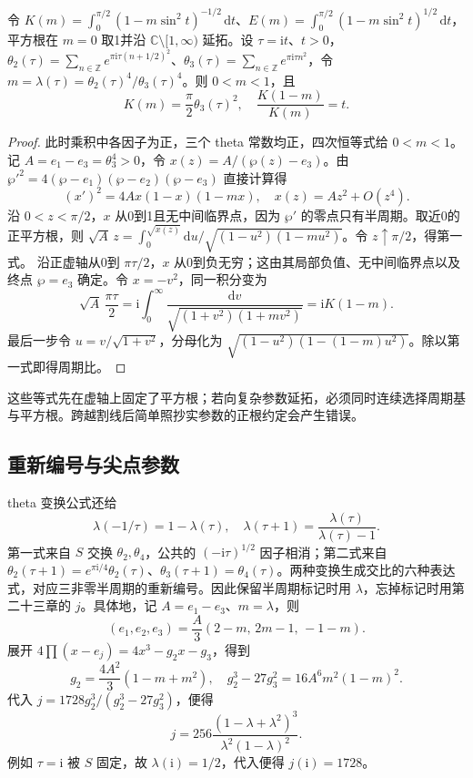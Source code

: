 \begin{proposition}\label{b3:prop:F-period-theta}
令 \(K(m)=\int_0^{\pi/2}(1-m\sin^2t)^{-1/2}\,\mathrm dt\)、\(E(m)=\int_0^{\pi/2}(1-m\sin^2t)^{1/2}\,\mathrm dt\)，平方根在 \(m=0\) 取1并沿 \(\mathbb C\setminus[1,\infty)\) 延拓。设 \(\tau=\mathrm it\)、\(t>0\)，\(\theta_2(\tau)=\sum_{n\in\mathbb Z}e^{\pi\mathrm i\tau(n+1/2)^2}\)、\(\theta_3(\tau)=\sum_{n\in\mathbb Z}e^{\pi\mathrm i\tau n^2}\)，令 \(m=\lambda(\tau)=\theta_2(\tau)^4/\theta_3(\tau)^4\)。则 \(0<m<1\)，且
\[
 K(m)=\frac\pi2\theta_3(\tau)^2,\quad
 \frac{K(1-m)}{K(m)}=t.
\]
\end{proposition}
\begin{proof}
此时乘积中各因子为正，三个 theta 常数均正，四次恒等式给 \(0<m<1\)。记 \(A=e_1-e_3=\theta_3^4>0\)，令
\(x(z)=A/(\wp(z)-e_3)\)。由 \(\wp'^2=4(\wp-e_1)(\wp-e_2)(\wp-e_3)\) 直接计算得
\[
 (x')^2=4A x(1-x)(1-mx),\quad x(z)=Az^2+O(z^4).
\]
沿 \(0<z<\pi/2\)，\(x\) 从0到1且无中间临界点，因为 \(\wp'\) 的零点只有半周期。取近0的正平方根，则
\(\sqrt A\,z=\int_0^{\sqrt{x(z)}}\mathrm{d}u/\sqrt{(1-u^2)(1-mu^2)}\)。令 \(z\uparrow\pi/2\)，得第一式。
沿正虚轴从0到 \(\pi\tau/2\)，\(x\) 从0到负无穷；这由其局部负值、无中间临界点以及终点 \(\wp=e_3\) 确定。令 \(x=-v^2\)，同一积分变为
\[
 \sqrt A\,\frac{\pi\tau}{2}
 =\mathrm{i}\int_0^\infty\frac{\mathrm{d}v}{\sqrt{(1+v^2)(1+mv^2)}}
 =\mathrm{i}K(1-m).
\]
最后一步令 \(u=v/\sqrt{1+v^2}\)，分母化为
\(\sqrt{(1-u^2)(1-(1-m)u^2)}\)。除以第一式即得周期比。
\end{proof}
这些等式先在虚轴上固定了平方根；若向复杂参数延拓，必须同时连续选择周期基与平方根。跨越割线后简单照抄实参数的正根约定会产生错误。
\ProseParagraphBreak
\subsection{重新编号与尖点参数}
\label{b3:subsec:F0503}

theta 变换公式还给
\[
 \lambda(-1/\tau)=1-\lambda(\tau),\quad
 \lambda(\tau+1)=\frac{\lambda(\tau)}{\lambda(\tau)-1}.
\]
第一式来自 \(S\) 交换 \(\theta_2,\theta_4\)，公共的 \((-\mathrm{i}\tau)^{1/2}\) 因子相消；第二式来自 \(\theta_2(\tau+1)=e^{\pi\mathrm{i}/4}\theta_2(\tau)\)、\(\theta_3(\tau+1)=\theta_4(\tau)\)。两种变换生成交比的六种表达式，对应三非零半周期的重新编号。因此保留半周期标记时用 \(\lambda\)，忘掉标记时用第二十三章的 \(j\)。具体地，记 \(A=e_1-e_3\)、\(m=\lambda\)，则
\[
(e_1,e_2,e_3)=\frac A3(2-m,\,2m-1,\,-1-m).
\]
展开 \(4\prod(x-e_j)=4x^3-g_2x-g_3\)，得到
\[
g_2=\frac{4A^2}{3}(1-m+m^2),\quad
g_2^3-27g_3^2=16A^6m^2(1-m)^2.
\]
代入 \(j=1728g_2^3/(g_2^3-27g_3^2)\)，便得
\[
 j=256\frac{(1-\lambda+\lambda^2)^3}{\lambda^2(1-\lambda)^2}.
\]
例如 \(\tau=\mathrm{i}\) 被 \(S\) 固定，故 \(\lambda(\mathrm{i})=1/2\)，代入便得 \(j(\mathrm{i})=1728\)。

